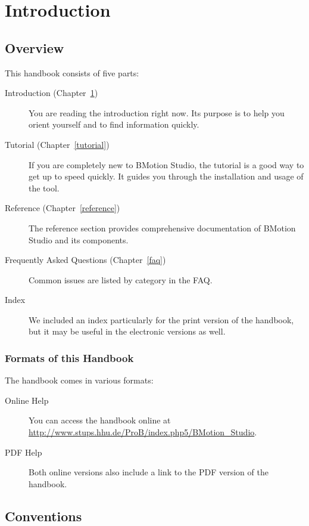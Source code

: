 \documentclass[twoside,10pt]{book}
\begin{document}
\chapter{Introduction}
\label{introduction}

\section{Overview}

This handbook consists of five parts:

\begin{description}
	\item[Introduction (Chapter~\ref{introduction})] You are reading the introduction right now.  Its purpose is to help you orient yourself and to find information quickly.
	\item[Tutorial (Chapter~\ref{tutorial})] If you are completely new to BMotion Studio, the tutorial is a good way to get up to speed quickly.  It guides you through the installation and usage of the tool.
	\item[Reference (Chapter~\ref{reference})] The reference section provides comprehensive documentation of BMotion Studio and its components.
	\item[Frequently Asked Questions  (Chapter~\ref{faq})] Common issues are listed by category in the FAQ.
	\item[Index] We included an index particularly for the print version of the handbook, but it may be useful in the electronic versions as well.  
\end{description}

\subsection{Formats of this Handbook}
\label{handbook_formats}

The handbook comes in various formats:

\begin{description}
	\item[Online Help] You can access the handbook online at \url{http://www.stups.hhu.de/ProB/index.php5/BMotion_Studio}.
	\item[PDF Help] Both online versions also include a link to the PDF version of the handbook.
\end{description}

\section{Conventions}
\label{conventions}
\end{document}
